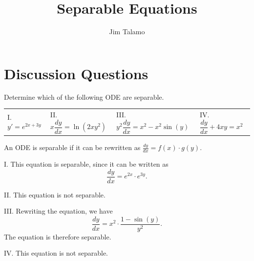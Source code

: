 \documentclass[]{ximera}
\author{Jim Talamo}
\title{Separable Equations}
\begin{document}
\begin{abstract}
\end{abstract}
\maketitle

\vspace{-0.9in}

\section{Discussion Questions}

\begin{problem} 

Determine which of the following ODE are separable.

\begin{tabular}{llll}

I. $y'=e^{2x+3y}$ \qquad & II. $x \dfrac{dy}{dx} =\ln(2xy^2)$ \qquad & III. $y^2 \dfrac{dy}{dx} = x^2-x^2\sin(y)$ \qquad & IV. $\dfrac{dy}{dx} +4xy =x^2$ 
\end{tabular}

\begin{solution}
An ODE is separable if it can be rewritten as $\frac{dy}{dx} = f(x) \cdot g(y)$. 

I. This equation is separable, since it can be written as 
$$
\frac{dy}{dx} = e^{2x} \cdot e^{3y}.
$$

II. This equation is not separable.

III. Rewriting the equation, we have 
$$
\frac{dy}{dx} = x^2 \cdot \frac{1-\sin(y)}{y^2}.
$$
The equation is therefore separable.

IV. This equation is not separable.
\end{solution}
\end{problem}


\end{document}
